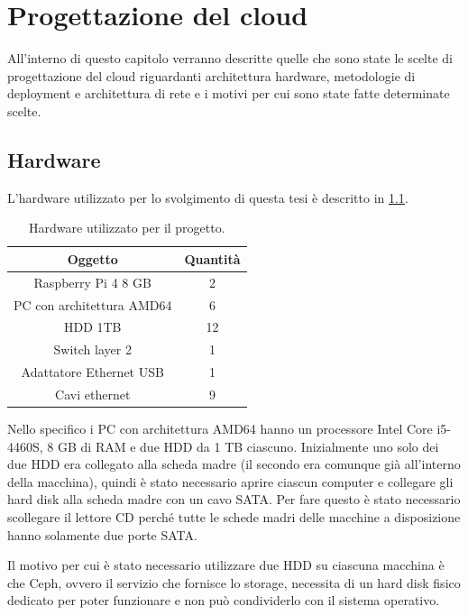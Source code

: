 \chapter{Progettazione del cloud}

All'interno di questo capitolo verranno descritte quelle che sono state le scelte di progettazione del cloud riguardanti architettura hardware, metodologie di deployment e architettura di rete e i motivi per cui sono state fatte determinate scelte.

\section{Hardware}\label{subsec:progettazione_hardware}

L'hardware utilizzato per lo svolgimento di questa tesi è descritto in \cref{tab:hardware_inventory}.

\begin{table}[H]
    \caption{Hardware utilizzato per il progetto.}
\begin{center}
        \begin{tabular}{ |c|c| }
\hline
\textbf{Oggetto} & \textbf{Quantità}\\
\hline
Raspberry Pi 4 8 GB & 2\\
PC con architettura AMD64 & 6\\
HDD 1TB & 12\\
Switch layer 2 & 1\\
            Adattatore Ethernet USB & 1\\
            Cavi ethernet & 9\\
\hline
\end{tabular}
\end{center}
    \label{tab:hardware_inventory}
\end{table}

\noindent
Nello specifico i PC con architettura AMD64 hanno un processore Intel Core i5-4460S, 8 GB di RAM e due HDD da 1 TB ciascuno.
% 
Inizialmente uno solo dei due HDD era collegato alla scheda madre (il secondo era comunque già all'interno della macchina), quindi è stato necessario aprire ciascun computer e collegare gli hard disk alla scheda madre con un cavo SATA. 
% 
Per fare questo è stato necessario scollegare il lettore CD perché tutte le schede madri delle macchine a disposizione hanno solamente due porte SATA.

Il motivo per cui è stato necessario utilizzare due HDD su ciascuna macchina è che Ceph, ovvero il servizio che fornisce lo storage, necessita di un hard disk fisico dedicato per poter funzionare e non può condividerlo con il sistema operativo.

